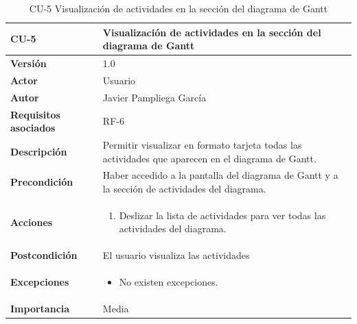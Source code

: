 \begin{table}[p]
	\centering
	\begin{tabularx}{\linewidth}{ p{} p{} }
		\toprule
		\textbf{CU-5}    & \textbf{Visualización de actividades en la sección del diagrama de Gantt}\\
		\toprule
		\textbf{Versión}              & 1.0    \\
            \textbf{Actor}                & Usuario \\
		\textbf{Autor}                & Javier Pampliega García \\
		\textbf{Requisitos asociados} & RF-6\\
		\textbf{Descripción}          & Permitir visualizar en formato tarjeta todas las actividades que aparecen en el diagrama de Gantt. \\
		\textbf{Precondición}         & Haber accedido a la pantalla del diagrama de Gantt y a la sección de actividades del diagrama. \\
		\textbf{Acciones}             &
		\begin{enumerate}
			\def\labelenumi{\arabic{enumi}.}
			\tightlist
			\item Deslizar la lista de actividades para ver todas las actividades del diagrama.
		\end{enumerate}\\
		\textbf{Postcondición}        & El usuario visualiza las actividades \\
		\textbf{Excepciones}          & \begin{itemize}
		    \item No existen excepciones.
		\end{itemize} \\
		\textbf{Importancia}          & Media \\
		\bottomrule
	\end{tabularx}
	\caption{CU-5 Visualización de actividades en la sección del diagrama de Gantt}
\end{table}

